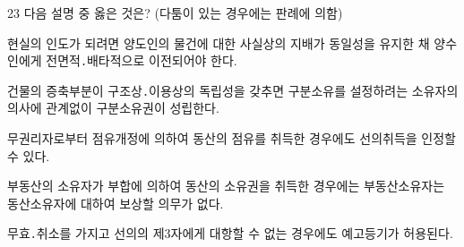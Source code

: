 \begin{question}{23}
다음 설명 중 옳은 것은? (다툼이 있는 경우에는 판례에 의함)
\begin{choices}
  \item 현실의 인도가 되려면 양도인의 물건에 대한 사실상의 지배가 동일성을 유지한 채 양수인에게 전면적․배타적으로 이전되어야 한다.
  \item 건물의 증축부분이 구조상․이용상의 독립성을 갖추면 구분소유를 설정하려는 소유자의 의사에 관계없이 구분소유권이 성립한다.
  \item 무권리자로부터 점유개정에 의하여 동산의 점유를 취득한 경우에도 선의취득을 인정할 수 있다.
  \item 부동산의 소유자가 부합에 의하여 동산의 소유권을 취득한 경우에는 부동산소유자는 동산소유자에 대하여 보상할 의무가 없다.
  \item 무효․취소를 가지고 선의의 제3자에게 대항할 수 없는 경우에도 예고등기가 허용된다.
\end{choices}
\end{question}
